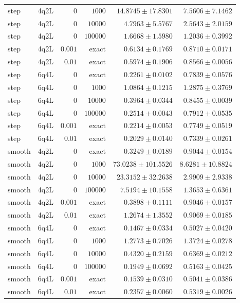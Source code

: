 \documentclass[11pt]{article}
\begin{document}
\begin{longtable}{llrrrr}
step & 4q2L & $0$ & $1000$ & $14.8745\pm17.8301$ & $7.5606\pm7.1462$ \\
step & 4q2L & $0$ & $10000$ & $4.7963\pm5.5767$ & $2.5643\pm2.0159$ \\
step & 4q2L & $0$ & $100000$ & $1.6668\pm1.5980$ & $1.2036\pm0.3992$ \\
step & 4q2L & $0.001$ & exact & $0.6134\pm0.1769$ & $0.8710\pm0.0171$ \\
step & 4q2L & $0.01$ & exact & $0.5974\pm0.1906$ & $0.8566\pm0.0056$ \\
\midrule
step & 6q4L & $0$ & exact & $0.2261\pm0.0102$ & $0.7839\pm0.0576$ \\
step & 6q4L & $0$ & $1000$ & $1.0864\pm0.1215$ & $1.2875\pm0.3769$ \\
step & 6q4L & $0$ & $10000$ & $0.3964\pm0.0344$ & $0.8455\pm0.0039$ \\
step & 6q4L & $0$ & $100000$ & $0.2514\pm0.0043$ & $0.7912\pm0.0535$ \\
step & 6q4L & $0.001$ & exact & $0.2214\pm0.0053$ & $0.7749\pm0.0519$ \\
step & 6q4L & $0.01$ & exact & $0.2029\pm0.0140$ & $0.7339\pm0.0261$ \\
\midrule
smooth & 4q2L & $0$ & exact & $0.3249\pm0.0189$ & $0.9044\pm0.0154$ \\
smooth & 4q2L & $0$ & $1000$ & $73.0238\pm101.5526$ & $8.6281\pm10.8824$ \\
smooth & 4q2L & $0$ & $10000$ & $23.3152\pm32.2638$ & $2.9909\pm2.9338$ \\
smooth & 4q2L & $0$ & $100000$ & $7.5194\pm10.1558$ & $1.3653\pm0.6361$ \\
smooth & 4q2L & $0.001$ & exact & $0.3898\pm0.1111$ & $0.9046\pm0.0157$ \\
smooth & 4q2L & $0.01$ & exact & $1.2674\pm1.3552$ & $0.9069\pm0.0185$ \\
\midrule
smooth & 6q4L & $0$ & exact & $0.1467\pm0.0334$ & $0.5027\pm0.0420$ \\
smooth & 6q4L & $0$ & $1000$ & $1.2773\pm0.7026$ & $1.3724\pm0.0278$ \\
smooth & 6q4L & $0$ & $10000$ & $0.4320\pm0.2159$ & $0.6369\pm0.0212$ \\
smooth & 6q4L & $0$ & $100000$ & $0.1949\pm0.0692$ & $0.5163\pm0.0425$ \\
smooth & 6q4L & $0.001$ & exact & $0.1539\pm0.0310$ & $0.5041\pm0.0386$ \\
smooth & 6q4L & $0.01$ & exact & $0.2357\pm0.0060$ & $0.5319\pm0.0026$ \\
\end{longtable}
\endgroup
\end{document}
